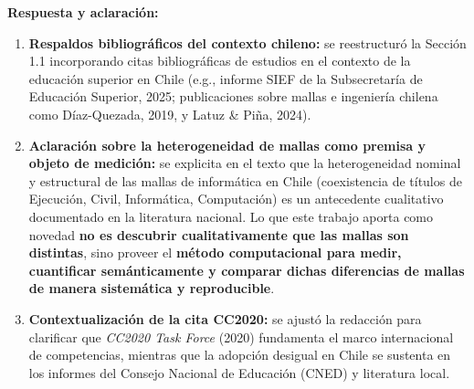 \noindent
{}

\vspace{0.2cm}

\noindent
\textbf{Respuesta y aclaración:}
\begin{enumerate}[leftmargin=*]
	\item \textbf{Respaldos bibliográficos del contexto chileno:} se reestructuró la Sección 1.1 incorporando citas bibliográficas de estudios en el contexto de la educación superior en Chile (e.g., informe SIEF de la Subsecretaría de Educación Superior, 2025; publicaciones sobre mallas e ingeniería chilena como Díaz-Quezada, 2019, y Latuz \& Piña, 2024).
	\item \textbf{Aclaración sobre la heterogeneidad de mallas como premisa y objeto de medición:} se explicita en el texto que la heterogeneidad nominal y estructural de las mallas de informática en Chile (coexistencia de títulos de Ejecución, Civil, Informática, Computación) es un antecedente cualitativo documentado en la literatura nacional. Lo que este trabajo aporta como novedad \textbf{no es descubrir cualitativamente que las mallas son distintas}, sino proveer el \textbf{método computacional para medir, cuantificar semánticamente y comparar dichas diferencias de mallas de manera sistemática y reproducible}.
	\item \textbf{Contextualización de la cita CC2020:} se ajustó la redacción para clarificar que \textit{CC2020 Task Force} (2020) fundamenta el marco internacional de competencias, mientras que la adopción desigual en Chile se sustenta en los informes del Consejo Nacional de Educación (CNED) y literatura local.
\end{enumerate}


